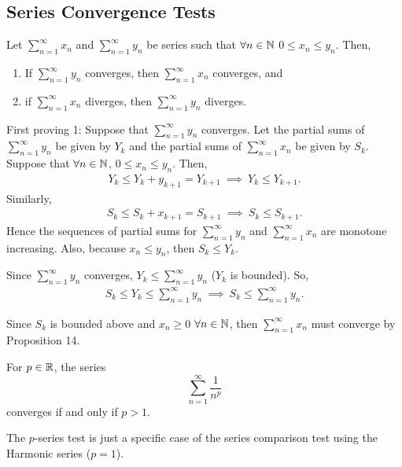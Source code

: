 \documentclass[12pt]{article}
\theoremstyle{definition}
\renewenvironment{proof}[1][\proofname]{\vspace{-10pt}\begin{replacementproof}}{\end{replacementproof}}
\newcommand{\xseries}{\sum_{n = 1}^{\infty}x_{n}}
\begin{document}
        \subsection{Series Convergence Tests}
            \begin{prop}
                Let $\xseries$ and $\sum_{n = 1}^{\infty}y_{n}$ be series such that $\forall n \in \mathbb{N}$ $0 \leq x_{n} \leq y_{n}$.
                Then,
                \begin{enumerate}
                    \item If $\sum_{n = 1}^{\infty}y_{n}$ converges, then $\xseries$ converges, and
                    \item if $\xseries$ diverges, then $\sum_{n = 1}^{\infty}y_{n}$ diverges.
                \end{enumerate}
            \end{prop}
            \begin{proof}
                First proving 1:
                Suppose that $\sum_{n = 1}^{\infty}y_{n}$ converges. Let the partial sums of $\sum_{n = 1}^{\infty}y_{n}$ be given by $Y_{k}$ and the partial sums of $\xseries$ be given by $S_{k}$. Suppose that $\forall n \in \mathbb{N}$, $0 \leq x_{n} \leq y_{n}$. Then,
                \begin{align*}
                    Y_{k} \leq Y_{k} + y_{k + 1} = Y_{k + 1} ~ \implies ~ Y_{k} \leq Y_{k + 1}.
                \end{align*}
                Similarly,
                \begin{align*}
                    S_{k} \leq S_{k} + x_{k + 1} = S_{k + 1} ~ \implies ~ S_{k} \leq S_{k + 1}.
                \end{align*}
                Hence the sequences of partial sums for $\sum_{n = 1}^{\infty}y_{n}$ and $\xseries$ are monotone increasing. Also, because $x_{n} \leq y_{n}$, then $S_{k} \leq Y_{k}$.

                Since $\sum_{n = 1}^{\infty}y_{n}$ converges, $Y_{k} \leq \sum_{n = 1}^{\infty}y_{n}$ ($Y_{k}$ is bounded). So,
                \begin{align*}
                    S_{k} \leq Y_{k} \leq \sum_{n = 1}^{\infty}y_{n} ~ \implies ~ S_{k} \leq \sum_{n = 1}^{\infty}y_{n}.
                \end{align*}

                Since $S_{k}$ is bounded above and $x_{n} \geq 0$ $\forall n \in \mathbb{N}$, then $\xseries$ must converge by Proposition 14.
            \end{proof}
            \begin{prop}
                For $p \in \R$, the series
                \begin{equation*}
                    \sum_{n = 1}^{\infty}\frac{1}{n^{p}}
                \end{equation*}
                converges if and only if $p > 1$.
            \end{prop}
            \begin{remark}
                The $p$-series test is just a specific case of the series comparison test using the Harmonic series ($p = 1$).
            \end{remark}
\end{document}
